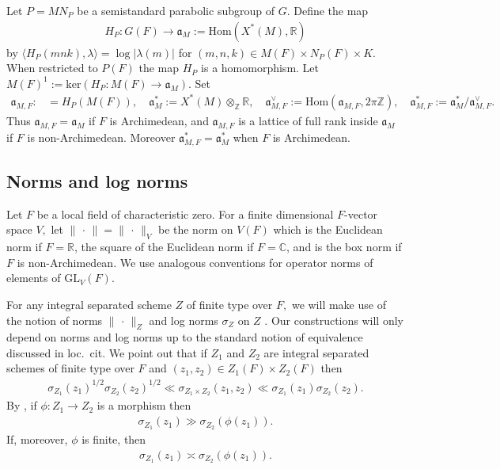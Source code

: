 \documentclass[12pt]{amsart}
\theoremstyle{remark}
\numberwithin{equation}{section}
\newcommand{\GL}{\mathrm{GL}}
\newcommand{\ZZ}{\mathbb{Z}}
\newcommand{\lto}{\longrightarrow}
\newcommand{\CC}{\mathbb{C}}
\newcommand{\RR}{\mathbb{R}}
\theoremstyle{definition}
\numberwithin{equation}{subsection}
\newcommand{\norm}[1]{\lVert#1\rVert}
\begin{document}
 Let $P=MN_P$ be a semistandard parabolic subgroup of $G.$  Define the map
\begin{align*}
    H_P:G(F) \lto \mathfrak{a}_M:=\mathrm{Hom}(X^*(M),\RR)
\end{align*}
by $\langle H_P(mnk),\lambda \rangle=\log |\lambda(m)|$ for $(m,n,k) \in M(F) \times N_P(F) \times K.$  
When restricted to $P(F)$ the map $H_P$ is a homomorphism. Let $
    M(F)^1:=\mathrm{ker} (H_P:M(F) \to \mathfrak{a}_M).$
Set
\begin{align} \label{A:gps} 
\mathfrak{a}_{M,F}:&=H_{P}(M(F)), 
    \quad \mathfrak{a}_M^*:=X^*(M) \otimes_{\ZZ} \RR, \quad
\mathfrak{a}_{M,F}^\vee:=\mathrm{Hom}(\mathfrak{a}_{M,F},2\pi \ZZ),\quad 
\mathfrak{a}_{M,F}^*:=\mathfrak{a}_{M}^*/\mathfrak{a}_{M,F}^\vee. 
\end{align}
Thus $\mathfrak{a}_{M,F}=\mathfrak{a}_M$ if $F$ is Archimedean, and $\mathfrak{a}_{M,F}$ is a lattice of full rank inside $\mathfrak{a}_{M}$ if $F$ is non-Archimedean.
Moreover $\mathfrak{a}_{M,F}^*=\mathfrak{a}_{M}^*$
 when $F$ is Archimedean.



\subsection{Norms and log norms}

Let $F$ be a local field of characteristic zero. For a finite dimensional $F$-vector space $V,$ let $\norm{\,\cdot\,}=\norm{\,\cdot\,}_V$ be the norm on $V(F)$ which is the Euclidean norm if $F=\RR$, the square of the Euclidean norm if $F=\CC$, and is the box norm if $F$ is non-Archimedean.  We use analogous conventions for operator norms of elements of $\GL_V(F).$

For any integral separated scheme $Z$ of finite type over $F,$ we will make use of the notion of norms $\norm{\,\cdot\,}_Z$ and log norms $\sigma_Z$ on $Z$ \cite[\S 18]{Kottwitz:Clay} \cite[\S 1.2]{BP:Ast}.  Our constructions will only depend on norms and log norms up to the standard notion of equivalence discussed in loc.~cit.  
We point out that if $Z_1$ and $Z_2$ are integral separated schemes of finite type over $F$ and $(z_1,z_2) \in Z_1(F) \times Z_2(F)$ then
\begin{align} \label{prod:log}
\sigma_{Z_1}(z_1)^{1/2}\sigma_{Z_2}(z_2)^{1/2} \ll \sigma_{Z_1 \times Z_2}(z_1,z_2) \ll \sigma_{Z_1}(z_1)\sigma_{Z_2}(z_2).
\end{align}
By \cite[Lemma 1.2.1]{BP:Ast}, if $\phi:Z_1 \to Z_2$ is a morphism then
\begin{align} \label{pullback}
\sigma_{Z_1}(z_1) \gg \sigma_{Z_2}(\phi(z_1)).
\end{align}
If, moreover, $\phi$ is finite, then
\begin{align} \label{iso:inv}
\sigma_{Z_1}(z_1) \asymp \sigma_{Z_2}(\phi(z_1)).
\end{align}
\end{document}
